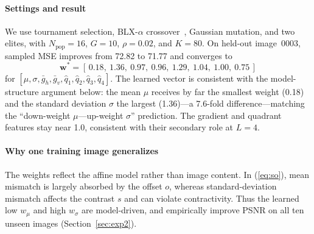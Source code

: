 \documentclass[conference, a4paper]{IEEEtran}
\begin{document}
\paragraph*{Settings and result} We use tournament selection, BLX-\mbox{$\alpha$} crossover~\cite{eshelman1993real}, Gaussian mutation, and two elites, with \mbox{$N_{\text{pop}}\!=\!16$}, \mbox{$G\!=\!10$}, \mbox{$\rho\!=\!0.02$}, and \mbox{$K\!=\!80$}. On held-out image~0003, sampled MSE improves from 72.82 to 71.77 and converges to
\begin{equation}
    \mathbf{w}^* = [\,0.18,\ 1.36,\ 0.97,\ 0.96,\ 1.29,\ 1.04,\ 1.00,\ 0.75\,]
    \label{eq:learned_w}
\end{equation}
for \mbox{$[\mu,\sigma,\bar g_h,\bar g_v,\hat q_1,\hat q_2,\hat q_3,\hat q_4]$}. The learned vector is consistent with the model-structure argument below: the mean \mbox{$\mu$} receives by far the smallest weight (0.18) and the standard deviation \mbox{$\sigma$} the largest (1.36)---a 7.6-fold difference---matching the ``down-weight \mbox{$\mu$}---up-weight \mbox{$\sigma$}'' prediction. The gradient and quadrant features stay near 1.0, consistent with their secondary role at \mbox{$L\!=\!4.$}

\paragraph*{Why one training image generalizes}
\label{sec:generalize}
The weights reflect the affine model rather than image content. In (\ref{eq:so}), mean mismatch is largely absorbed by the offset \mbox{$o$}, whereas standard-deviation mismatch affects the contrast \mbox{$s$} and can violate contractivity. Thus the learned low \mbox{$w_\mu$} and high \mbox{$w_\sigma$} are model-driven, and empirically improve PSNR on all ten unseen images (Section~\ref{sec:exp2}).
\end{document}
